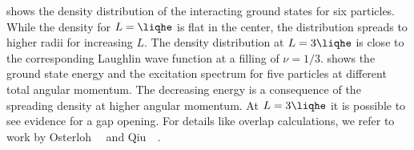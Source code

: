  shows the density distribution of the interacting ground states for six particles. While the density for $L=\liqhe$ is flat in the center, the distribution spreads to higher radii for increasing $L$. The density distribution at $L=3\liqhe$ is close to the corresponding Laughlin wave function at a filling of $\nu=1/3$.  shows the ground state energy and the excitation spectrum for five particles at different total angular momentum. The decreasing energy is a consequence of the spreading density at higher angular momentum. At $L=3\liqhe$ it is possible to see evidence for a gap opening. For details like overlap calculations, we refer to work by Osterloh~\etal~\cite{Osterloh2007} and Qiu~\etal~\cite{Qiu2011}.
